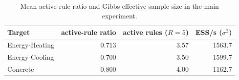 \begin{table}[htbp]
\centering
\caption{Mean active-rule ratio and Gibbs effective sample size in the main experiment.}
\label{tab:active}
\scriptsize
\begin{tabular}{lrrr}
\toprule
Target & active-rule ratio & active rules ($R=5$) & ESS/s ($\sigma^2$) \\
\midrule
Energy-Heating & 0.713 & 3.57 & 1563.7 \\
Energy-Cooling & 0.700 & 3.50 & 1599.7 \\
Concrete & 0.800 & 4.00 & 1162.7 \\
\bottomrule
\end{tabular}
\end{table}
